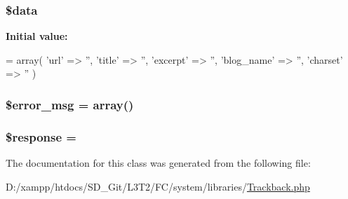 \subsubsection[{\$data}]{\setlength{\rightskip}{0pt plus 5cm}\${\bf data}}\label{class_c_i___trackback_a6efc15b5a2314dd4b5aaa556a375c6d6}
{\bfseries Initial value\+:}
\begin{DoxyCode}
= array(
        \textcolor{stringliteral}{'url'} => \textcolor{stringliteral}{''},
        \textcolor{stringliteral}{'title'} => \textcolor{stringliteral}{''},
        \textcolor{stringliteral}{'excerpt'} => \textcolor{stringliteral}{''},
        \textcolor{stringliteral}{'blog\_name'} => \textcolor{stringliteral}{''},
        \textcolor{stringliteral}{'charset'} => \textcolor{stringliteral}{''}
    )
\end{DoxyCode}
\hypertarget{class_c_i___trackback_acf910733622c1fa671b9f755c69c2ec7}{}
\subsubsection[{\$error\+\_\+msg}]{\setlength{\rightskip}{0pt plus 5cm}\$error\+\_\+msg = array()}\label{class_c_i___trackback_acf910733622c1fa671b9f755c69c2ec7}
\hypertarget{class_c_i___trackback_af4b6fb1bbc77ccc05f10da3b16935b99}{}
\subsubsection[{\$response}]{\setlength{\rightskip}{0pt plus 5cm}\$response = \textquotesingle{}\textquotesingle{}}\label{class_c_i___trackback_af4b6fb1bbc77ccc05f10da3b16935b99}


The documentation for this class was generated from the following file\+:\begin{DoxyCompactItemize}
\item 
D\+:/xampp/htdocs/\+S\+D\+\_\+\+Git/\+L3\+T2/\+F\+C/system/libraries/\hyperlink{_trackback_8php}{Trackback.\+php}\end{DoxyCompactItemize}
